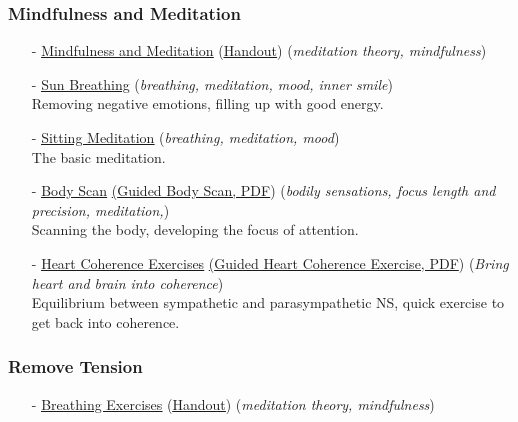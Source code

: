 \begin{frame}
\frametitle{Mindfulness and Meditation}
\begin{itemize}

\item[-] \href{run:./Mindfulness_Meditation.pdf}{\underline{Mindfulness and Meditation}} 
(\href{run:./Mindfulness_Meditation_Handout.pdf}{\underline{Handout}})
 (\textit{meditation theory, mindfulness})\\

\item[-] \href{run:./Sun_Breathing.pdf}{\underline{Sun Breathing}} 
 (\textit{breathing, meditation, mood, inner smile})\\
Removing negative emotions, filling up with good energy.
\item[-] \href{run:./Sitting_Meditation.pdf}{\underline{Sitting Meditation}} 
 (\textit{breathing, meditation, mood})\\
The basic meditation.
\item[-] \href{run:./Bodyscan.pdf}{\underline{Body Scan}} \href{run:./Bodyscan_guided.pdf} ({\underline{Guided Body Scan, PDF}}) 
 (\textit{bodily sensations, focus length and precision, meditation,})\\
Scanning the body, developing the focus of attention.

\item[-] \href{run:./HeartCoherence.pdf}{\underline{Heart Coherence Exercises}} \href{run:./HearthCoherence_guided.pdf} ({\underline{Guided Heart Coherence Exercise, PDF}}) 
 (\textit{Bring heart and brain into coherence})\\
Equilibrium between sympathetic and parasympathetic NS, quick exercise to get back into coherence.

\end{itemize}
\end{frame}

\begin{frame}
\frametitle{Remove Tension}
\begin{itemize}

\item[-] \href{run:./Mindfulness_Meditation.pdf}{\underline{Breathing Exercises}} %
(\href{run:./Mindfulness_Meditation_Handout.pdf}{\underline{Handout}})
 (\textit{meditation theory, mindfulness})\\

\end{itemize}
\end{frame}


 
